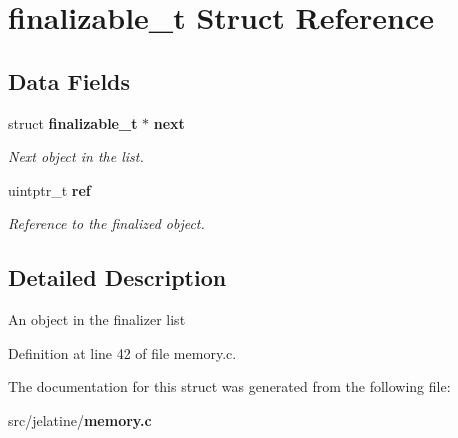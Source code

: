 \section{finalizable\_\-t Struct Reference}
\label{structfinalizable__t}
\subsection*{Data Fields}
\begin{DoxyCompactItemize}
\item 
struct {\bf finalizable\_\-t} $\ast$ {\bf next}\label{structfinalizable__t_ab687e84d31c2209c259ced01990c5108}

\begin{DoxyCompactList}\small\item\em Next object in the list. \item\end{DoxyCompactList}\item 
uintptr\_\-t {\bf ref}\label{structfinalizable__t_a32dc78b64baec5a9c52389376c29f1b6}

\begin{DoxyCompactList}\small\item\em Reference to the finalized object. \item\end{DoxyCompactList}\end{DoxyCompactItemize}


\subsection{Detailed Description}
An object in the finalizer list 

Definition at line 42 of file memory.c.



The documentation for this struct was generated from the following file:\begin{DoxyCompactItemize}
\item 
src/jelatine/{\bf memory.c}\end{DoxyCompactItemize}
